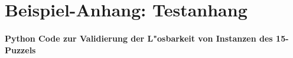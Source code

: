 \chapter{Beispiel-Anhang: Testanhang}


\subsubsection{Python Code zur Validierung der L"osbarkeit von Instanzen des 15-Puzzels}
\label{ssec:appendix-latency-benchmark}
\begin{lstlisting}[caption={Python Code zur Validierung der L"osbarkeit von Instanzen des 15-Puzzels}, label={code:validate-15-puzzle:py}]
\end{lstlisting}
\inputminted[linenos,breaklines,breakanywhere]{python}{../code/15-solvable-v1.py}
\newpage

